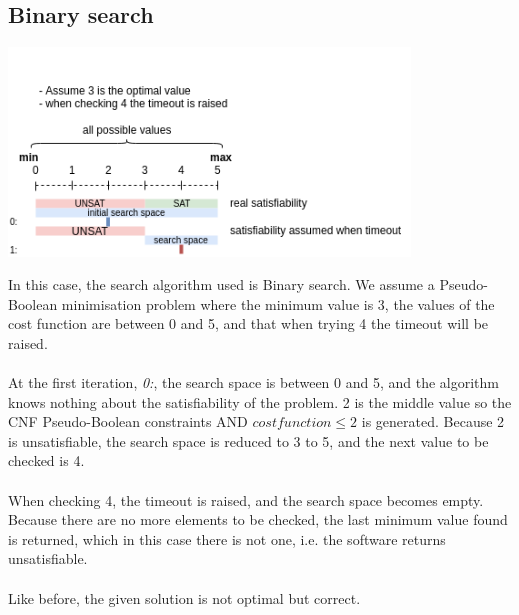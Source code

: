 \subsection{Binary search}
\begin{center}
	\includegraphics[width=0.8\textwidth]{Figures/GeneralTimeoutBinarySearch.png}
	\label{GeneralTimeoutBinarySearch}
\end{center}
In this case, the search algorithm used is Binary search. We assume a Pseudo-Boolean minimisation problem where the minimum value is 3, the values of the cost function are between 0 and 5, and that when trying 4 the timeout will be raised. \\\\
At the first iteration, \emph{0:}, the search space is between 0 and 5, and the algorithm knows nothing about the satisfiability of the problem. 2 is the middle value so the CNF Pseudo-Boolean constraints AND $cost function \leq 2$ is generated. Because 2 is unsatisfiable, the search space is reduced to 3 to 5, and the next value to be checked is 4. \\\\
When checking 4, the timeout is raised, and the search space becomes empty. Because there are no more elements to be checked, the last minimum value found is returned, which in this case there is not one, i.e. the software returns unsatisfiable. \\\\
Like before, the given solution is not optimal but correct. 